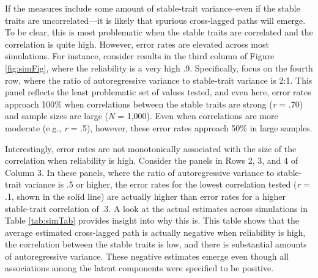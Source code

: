 \documentclass[
  english,
  man,floatsintext]{apa6}
\begin{document}
If the measures include some amount of stable-trait variance--even if the stable traits are uncorrelated---it is likely that spurious cross-lagged paths will emerge. To be clear, this is most problematic when the stable traits are correlated and the correlation is quite high. However, error rates are elevated across most simulations. For instance, consider results in the third column of Figure \ref{fig:simFig}, where the reliability is a very high .9. Specifically, focus on the fourth row, where the ratio of autoregressive variance to stable-trait variance is 2:1. This panel reflects the least problematic set of values tested, and even here, error rates approach 100\% when correlations between the stable traits are strong (\emph{r} = .70) and sample sizes are large (\emph{N} = 1,000). Even when correlations are more moderate (e.g., \emph{r} = .5), however, these error rates approach 50\% in large samples.

Interestingly, error rates are not monotonically associated with the size of the correlation when reliability is high. Consider the panels in Rows 2, 3, and 4 of Column 3. In these panels, where the ratio of autoregressive variance to stable-trait variance is .5 or higher, the error rates for the lowest correlation tested (\emph{r} = .1, shown in the solid line) are actually higher than error rates for a higher stable-trait correlation of .3. A look at the actual estimates across simulations in Table \ref{tab:simTab} provides insight into why this is. This table shows that the average estimated cross-lagged path is actually negative when reliability is high, the correlation between the stable traits is low, and there is substantial amounts of autoregressive variance. These negative estimates emerge even though all associations among the latent components were specified to be positive.
\end{document}
